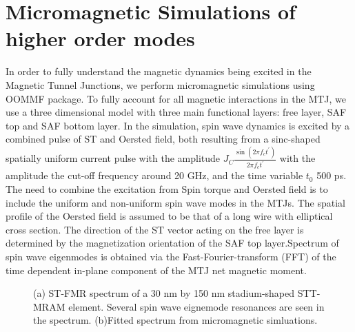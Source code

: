 \section{Micromagnetic Simulations of higher order modes}
In order to fully understand the magnetic dynamics being excited in the Magnetic Tunnel Junctions, we perform micromagnetic simulations using OOMMF package\cite{OOMMF}. To fully account for all magnetic interactions in the MTJ, we use a three dimensional model with three main functional layers: free layer, SAF top and SAF bottom layer. In the simulation, spin wave dynamics is excited by a combined pulse of ST and Oersted field, both resulting from a sinc-shaped spatially uniform current pulse with the amplitude $J_{C}\frac{\sin(2\pi f_{c} t^{'})}{2\pi f_{c}t^{'}} $ with the amplitude the cut-off frequency around 20 GHz, and the time variable $t_{0}$ 500 ps. The need to combine the excitation from Spin torque and Oersted field is to include the uniform and non-uniform spin wave modes in the MTJs\cite{Modes}.
The spatial profile of the Oersted field is assumed to be that of a long wire with elliptical cross section. The direction of the ST vector acting on the free layer is determined by the magnetization orientation of the SAF top layer.Spectrum of spin wave eigenmodes is obtained via the Fast-Fourier-transform (FFT) of the time dependent in-plane component of the MTJ net magnetic moment. 




\begin{figure}[!ht]
\centering
{}
\caption{(a) ST-FMR spectrum of a 30 nm by 150 nm stadium-shaped STT-MRAM element. Several spin wave eignemode resonances are seen in the spectrum. (b)Fitted spectrum from micromagnetic simluations.}
\end{figure}

